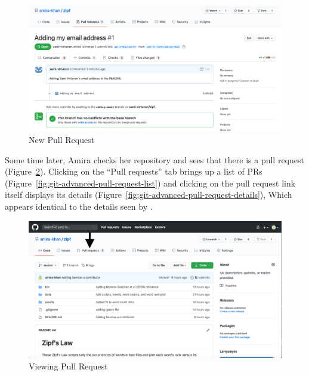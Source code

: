 \documentclass[
]{krantz}
\begin{document}
\begin{figure}

{\centering \includegraphics[width=1\linewidth]{figures/git-advanced/new-pull-request} 

}

\caption{New Pull Request}\label{fig:git-advanced-pull-request-new}
\end{figure}

Some time later,
Amira checks her repository and sees that there is a pull request
(Figure~\ref{fig:git-advanced-pull-request-viewing}).
Clicking on the ``Pull requests'' tab brings up a list of PRs
(Figure~\ref{fig:git-advanced-pull-request-list})
and clicking on the pull request link itself displays its details
(Figure~\ref{fig:git-advanced-pull-request-details}),
Which appears identical to the details seen by .

\begin{figure}

{\centering \includegraphics[width=1\linewidth]{figures/git-advanced/viewing-new-pull-request} 

}

\caption{Viewing Pull Request}\label{fig:git-advanced-pull-request-viewing}
\end{figure}
\end{document}
